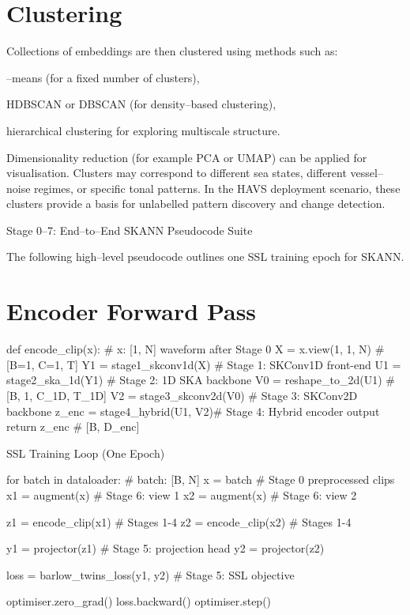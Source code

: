 \documentclass[12pt]{article}
\begin{document}
\section*{Clustering}
Collections of embeddings are then clustered using methods such as:

–means (for a fixed number of clusters),

HDBSCAN or DBSCAN (for density–based clustering),

hierarchical clustering for exploring multiscale structure.

Dimensionality reduction (for example PCA or UMAP) can be applied for visualisation. Clusters may correspond to different sea states, different vessel–noise regimes, or specific tonal patterns. In the HAVS deployment scenario, these clusters provide a basis for unlabelled pattern discovery and change detection.

Stage 0–7: End–to–End SKANN Pseudocode Suite

The following high–level pseudocode outlines one SSL training epoch for SKANN.

\section*{Encoder Forward Pass}
def encode_clip(x):
    \# x: [1, N] waveform after Stage 0
    X = x.view(1, 1, N)          \# [B=1, C=1, T]
    Y1 = stage1_skconv1d(X)      \# Stage 1: SKConv1D front-end
    U1 = stage2_ska_1d(Y1)       \# Stage 2: 1D SKA backbone
    V0 = reshape_to_2d(U1)       \# [B, 1, C_1D, T_1D]
    V2 = stage3_skconv2d(V0)     \# Stage 3: SKConv2D backbone
    z_enc = stage4_hybrid(U1, V2)\# Stage 4: Hybrid encoder output
    return z_enc                 \# [B, D_enc]

SSL Training Loop (One Epoch)

for batch in dataloader:  \# batch: [B, N]
    x = batch                         \# Stage 0 preprocessed clips
    x1 = augment(x)                   \# Stage 6: view 1
    x2 = augment(x)                   \# Stage 6: view 2

    z1 = encode_clip(x1)              \# Stages 1-4
    z2 = encode_clip(x2)              \# Stages 1-4

    y1 = projector(z1)                \# Stage 5: projection head
    y2 = projector(z2)

    loss = barlow_twins_loss(y1, y2)  \# Stage 5: SSL objective

    optimiser.zero_grad()
    loss.backward()
    optimiser.step()
\end{document}
